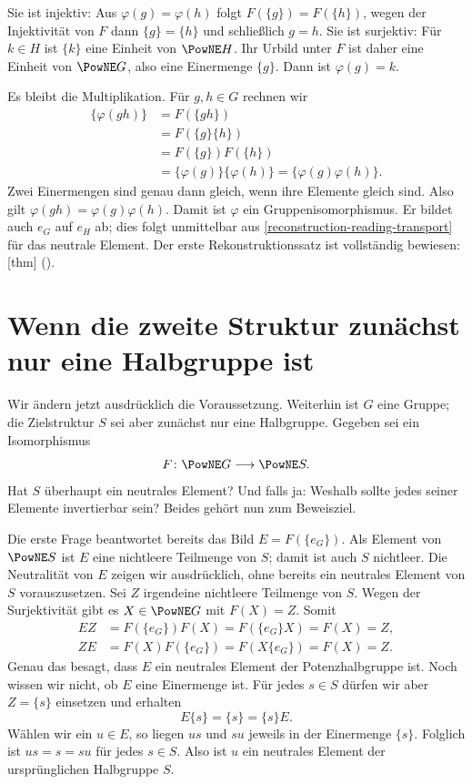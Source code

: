 Sie ist injektiv: Aus \(\varphi(g)=\varphi(h)\) folgt
\(F(\{g\})=F(\{h\})\), wegen der Injektivität von \(F\)
dann \(\{g\}=\{h\}\) und schließlich \(g=h\).
Sie ist surjektiv: Für \(k\in H\) ist \(\{k\}\) eine Einheit
von \(\PowNE H\). Ihr Urbild unter \(F\) ist daher eine
Einheit von \(\PowNE G\), also eine Einermenge \(\{g\}\).
Dann ist \(\varphi(g)=k\).

Es bleibt die Multiplikation. Für \(g,h\in G\) rechnen wir
\[
  \begin{aligned}
    \{\varphi(gh)\}
       &=F(\{gh\})\\
       &=F(\{g\}\{h\})\\
       &=F(\{g\})F(\{h\})\\
       &=\{\varphi(g)\}\{\varphi(h)\}
        =\{\varphi(g)\varphi(h)\}.
  \end{aligned}
\]
Zwei Einermengen sind genau dann gleich, wenn ihre Elemente
gleich sind. Also gilt \(\varphi(gh)=\varphi(g)\varphi(h)\).
Damit ist \(\varphi\) ein Gruppenisomorphismus. Er bildet auch
\(e_G\) auf \(e_H\) ab; dies folgt unmittelbar aus
\eqref{reconstruction-reading-transport} für das neutrale Element.
Der erste Rekonstruktionssatz ist vollständig bewiesen:
[thm]
().

\par{}
\section*{Wenn die zweite Struktur zunächst nur eine Halbgruppe ist}
\hypertarget{reconstruction.reading.identity}{}

Wir ändern jetzt ausdrücklich die Voraussetzung. Weiterhin ist
\(G\) eine Gruppe; die Zielstruktur \(S\) sei aber zunächst
nur eine Halbgruppe. Gegeben sei ein Isomorphismus
\[
  F\colon\PowNE G\longrightarrow\PowNE S.
\]
Hat \(S\) überhaupt ein neutrales Element? Und falls ja:
Weshalb sollte jedes seiner Elemente invertierbar sein?
Beides gehört nun zum Beweisziel.

Die erste Frage beantwortet bereits das Bild
\(E=F(\{e_G\})\). Als Element von \(\PowNE S\) ist \(E\)
eine nichtleere Teilmenge von \(S\); damit ist auch \(S\)
nichtleer. Die Neutralität von \(E\) zeigen wir ausdrücklich,
ohne bereits ein neutrales Element von \(S\) vorauszusetzen.
Sei \(Z\) irgendeine nichtleere Teilmenge von \(S\). Wegen der
Surjektivität gibt es \(X\in\PowNE G\) mit \(F(X)=Z\). Somit
\[
  \begin{aligned}
    EZ&=F(\{e_G\})F(X)=F(\{e_G\}X)=F(X)=Z,\\
    ZE&=F(X)F(\{e_G\})=F(X\{e_G\})=F(X)=Z.
  \end{aligned}
\]
Genau das besagt, dass \(E\) ein neutrales Element der
Potenzhalbgruppe ist. Noch wissen wir nicht, ob \(E\) eine
Einermenge ist. Für jedes \(s\in S\) dürfen wir aber
\(Z=\{s\}\) einsetzen und erhalten
\[
  E\{s\}=\{s\}=\{s\}E.
\]
Wählen wir ein \(u\in E\), so liegen \(us\) und \(su\)
jeweils in der Einermenge \(\{s\}\). Folglich ist
\(us=s=su\) für jedes \(s\in S\). Also ist \(u\) ein
neutrales Element der ursprünglichen Halbgruppe \(S\).

